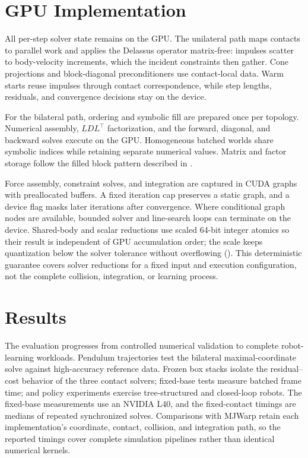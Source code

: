 \documentclass{article}
\theoremstyle{plain}
\theoremstyle{definition}
\begin{document}
\section{GPU Implementation}
\label{sec:gpu}

All per-step solver state remains on the GPU. The unilateral path maps contacts
to parallel work and applies the Delassus operator matrix-free: impulses scatter
to body-velocity increments, which the incident constraints then gather.
Cone projections and block-diagonal preconditioners use contact-local data.
Warm starts reuse impulses through contact correspondence, while step lengths,
residuals, and convergence decisions stay on the device.

For the bilateral path, ordering and symbolic fill are prepared once per
topology. Numerical assembly, $LDL^\top$ factorization, and the forward,
diagonal, and backward solves execute on the GPU. Homogeneous batched worlds
share symbolic indices while retaining separate numerical values. Matrix and
factor storage follow the filled block pattern described in .

Force assembly, constraint solves, and integration are captured in CUDA graphs
with preallocated buffers. A fixed iteration cap preserves a static graph, and
a device flag masks later iterations after convergence. Where conditional graph
nodes are available, bounded solver and line-search loops can terminate on the
device. Shared-body and scalar reductions use scaled 64-bit integer atomics so
their result is independent of GPU accumulation order; the scale keeps
quantization below the solver tolerance without overflowing
(). This deterministic guarantee covers solver reductions
for a fixed input and execution configuration, not the complete collision,
integration, or learning process.

\FloatBarrier
\section{Results}
\label{sec:results}

The evaluation progresses from controlled numerical validation to complete
robot-learning workloads. Pendulum trajectories test the bilateral
maximal-coordinate solve against high-accuracy reference data. Frozen box
stacks isolate the residual--cost behavior of the three contact solvers;
fixed-base tests measure batched frame time; and policy experiments exercise
tree-structured and closed-loop robots. The fixed-base measurements use an
NVIDIA L40, and the fixed-contact timings are medians of repeated synchronized
solves. Comparisons with MJWarp retain each implementation's coordinate,
contact, collision, and integration path, so the reported timings cover
complete simulation pipelines rather than identical numerical kernels.
\end{document}
